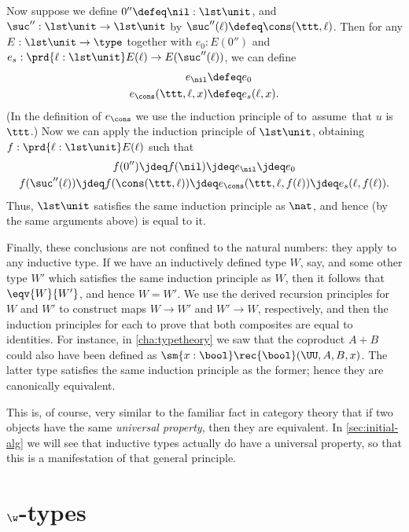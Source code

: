 Now suppose we define $0'' \defeq \nil: \lst\unit$, and $\suc'':\lst\unit\to\lst\unit$ by $\suc''(\ell) \defeq \cons(\ttt,\ell)$.
Then for any $E:\lst\unit\to\type$ together with $e_0:E(0'')$ and $e_s:\prd{\ell:\lst\unit} E(\ell) \to E(\suc''(\ell))$, we can define
\begin{align*}
  e_\nil &\defeq e_0\\
  e_\cons(\ttt,\ell,x) &\defeq e_s(\ell,x).
\end{align*}
(In the definition of $e_\cons$ we use the induction principle of \unit to assume that $u$ is $\ttt$.)
Now we can apply the induction principle of $\lst\unit$, obtaining $f:\prd{\ell:\lst\unit} E(\ell)$ such that
\begin{gather*}
  f(0'') \jdeq f(\nil) \jdeq e_\nil \jdeq e_0\\
  f(\suc''(\ell)) \jdeq f(\cons(\ttt,\ell)) \jdeq e_\cons(\ttt,\ell,f(\ell)) \jdeq e_s(\ell,f(\ell)).
\end{gather*}
Thus, $\lst\unit$ satisfies the same induction principle as $\nat$, and hence (by the same arguments above) is equal to it.

Finally, these conclusions are not confined to the natural numbers: they apply to any inductive type.
If we have an inductively defined type $W$, say, and some other type $W'$ which satisfies the same induction principle as $W$, then it follows that $\eqv{W}{W'}$, and hence $W=W'$.
We use the derived recursion principles for $W$ and $W'$ to construct maps $W\to W'$ and $W'\to W$, respectively, and then the induction principles for each to prove that both composites are equal to identities.
For instance, in \cref{cha:typetheory} we saw that the coproduct $A+B$ could also have been defined as $\sm{x:\bool} \rec{\bool}(\UU,A,B,x)$.
The latter type satisfies the same induction principle as the former; hence they are canonically equivalent.

This is, of course, very similar to the familiar fact in category theory that if two objects have the same \emph{universal property}, then they are equivalent.
In \cref{sec:initial-alg} we will see that inductive types actually do have a universal property, so that this is a manifestation of that general principle.


\section{\texorpdfstring{$\w$}{W}-types}
\label{sec:w-types}


